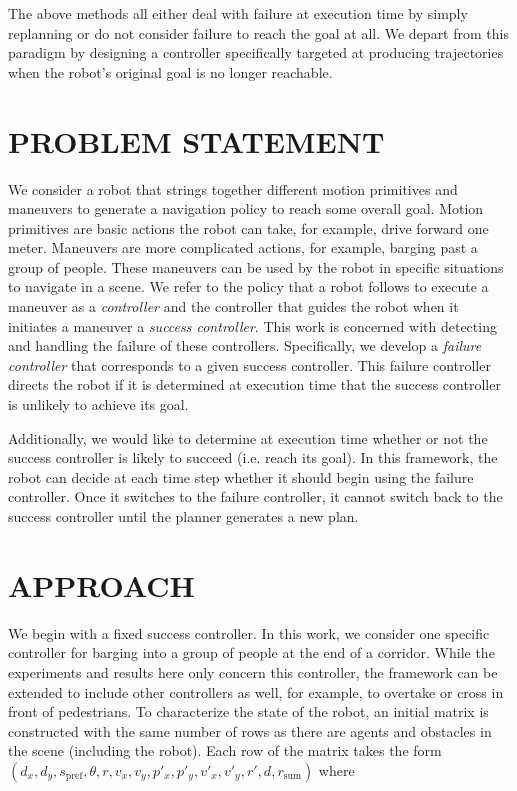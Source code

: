 \documentclass[letterpaper, 10 pt, conference]{ieeeconf}  %
\begin{document}
	The above methods all either deal with failure at execution time by simply replanning or do not consider failure to reach the goal at all. We depart from this paradigm by designing a controller specifically targeted at producing trajectories when the robot's original goal is no longer reachable.
	
\section{PROBLEM STATEMENT}\label{sec:problemstatement}
	We consider a robot that strings together different motion primitives and maneuvers to generate a navigation policy to reach some overall goal. Motion primitives are basic actions the robot can take, for example, drive forward one meter. Maneuvers are more complicated actions, for example, barging past a group of people. These maneuvers can be used by the robot in specific situations to navigate in a scene. We refer to the policy that a robot follows to execute a maneuver as a \textit{controller} and the controller that guides the robot when it initiates a maneuver a \textit{success controller}. This work is concerned with detecting and handling the failure of these controllers. Specifically, we develop a \textit{failure controller} that corresponds to a given success controller. This failure controller directs the robot if it is determined at execution time that the success controller is unlikely to achieve its goal. 
	
	Additionally, we would like to determine at execution time whether or not the success controller is likely to succeed (i.e. reach its goal). In this framework, the robot can decide at each time step whether it should begin using the failure controller. Once it switches to the failure controller, it cannot switch back to the success controller until the planner generates a new plan. 
		
\section{APPROACH}\label{sec:approach}
	We begin with a fixed success controller. In this work, we consider one specific controller for barging into a group of people at the end of a corridor. While the experiments and results here only concern this controller, the framework can be extended to include other controllers as well, for example, to overtake or cross in front of pedestrians. To characterize the state of the robot, an initial matrix is constructed with the same number of rows as there are agents and obstacles in the scene (including the robot). Each row of the matrix takes the form $(d_x, d_y, s_\text{pref}, \theta, r, v_x, v_y, p'_x, p'_y, v'_x, v'_y, r', d, r_\text{sum})$ where 
	
\end{document}
